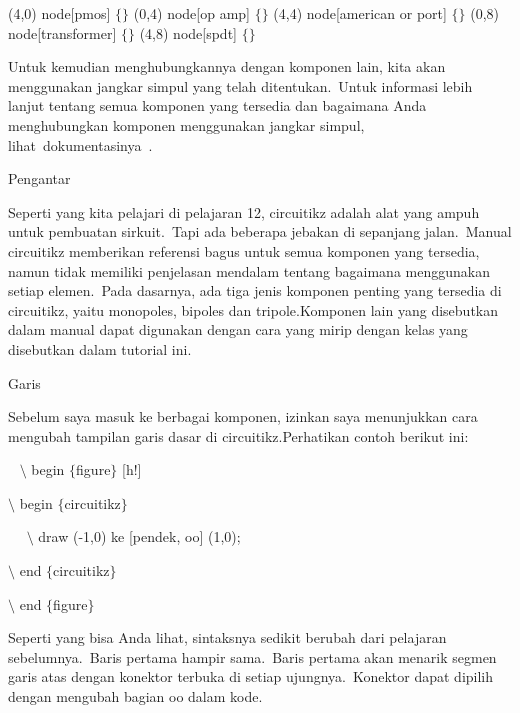 \noindent 
 (4,0) node[pmos] $ \{ $$ \} $ (0,4) node[op amp] $ \{ $$ \} $ (4,4) node[american or port] $ \{ $$ \} $ (0,8) node[transformer] $ \{ $$ \} $ (4,8) node[spdt] $ \{ $$ \} $ 
\par


\noindent 
Untuk kemudian menghubungkannya dengan komponen lain, kita akan menggunakan jangkar simpul yang telah ditentukan. Untuk informasi lebih lanjut tentang semua komponen yang tersedia dan bagaimana Anda menghubungkan komponen menggunakan jangkar simpul, lihat dokumentasinya .
\par


\noindent 
Pengantar
\par


\noindent 
Seperti yang kita pelajari di pelajaran 12, circuitikz adalah alat yang ampuh untuk pembuatan sirkuit. Tapi ada beberapa jebakan di sepanjang jalan. Manual circuitikz memberikan referensi bagus untuk semua komponen yang tersedia, namun tidak memiliki penjelasan mendalam tentang bagaimana menggunakan setiap elemen. Pada dasarnya, ada tiga jenis komponen penting yang tersedia di circuitikz, yaitu monopoles, bipoles dan tripole.Komponen lain yang disebutkan dalam manual dapat digunakan dengan cara yang mirip dengan kelas yang disebutkan dalam tutorial ini.
\par


\noindent 
Garis
\par


\noindent 
Sebelum saya masuk ke berbagai komponen, izinkan saya menunjukkan cara mengubah tampilan garis dasar di circuitikz.Perhatikan contoh berikut ini:
\par


\noindent 
~ $\setminus$ begin $ \{ $figure$ \} $ [h!]
\par


\noindent 
 $\setminus$ begin $ \{ $circuitikz$ \} $
\par


\noindent 
~~ $\setminus$ draw (-1,0) ke [pendek, oo] (1,0);
\par


\noindent 
 $\setminus$ end $ \{ $circuitikz$ \} $
\par


\noindent 
 $\setminus$ end $ \{ $figure$ \} $ 
\par


\noindent 
Seperti yang bisa Anda lihat, sintaksnya sedikit berubah dari pelajaran sebelumnya. Baris pertama hampir sama. Baris pertama akan menarik segmen garis atas dengan konektor terbuka di setiap ujungnya. Konektor dapat dipilih dengan mengubah bagian oo dalam kode.
\par


